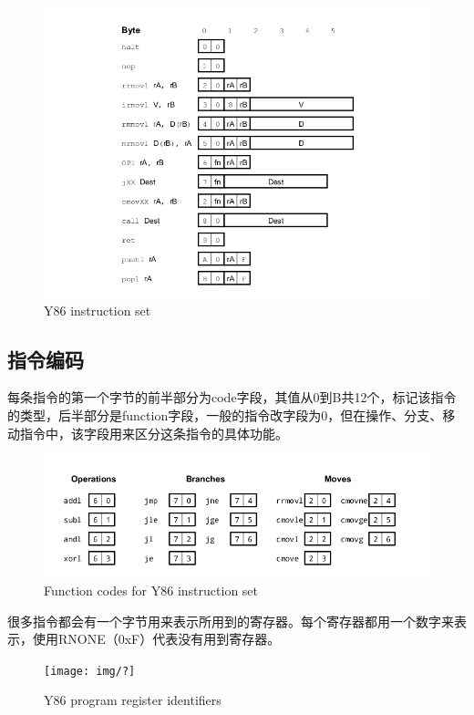 \begin{figure}[htbp]
\centering
\includegraphics{img/isa.png}
\caption{Y86 instruction set}
\end{figure}

\subsection{指令编码}\label{ux6307ux4ee4ux7f16ux7801}

每条指令的第一个字节的前半部分为code字段，其值从0到B共12个，标记该指令的类型，后半部分是function字段，一般的指令改字段为0，但在操作、分支、移动指令中，该字段用来区分这条指令的具体功能。

\begin{figure}[htbp]
\centering
\includegraphics{img/icodes.png}
\caption{Function codes for Y86 instruction set}
\end{figure}

很多指令都会有一个字节用来表示所用到的寄存器。每个寄存器都用一个数字来表示，使用RNONE（0xF）代表没有用到寄存器。

\begin{figure}[htbp]
\centering
\texttt{[image: img/?]}
\caption{Y86 program register identifiers}
\end{figure}

